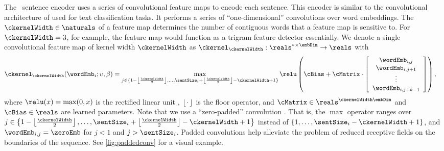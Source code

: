 The \convolutionalneuralnetwork~sentence encoder uses a series of convolutional
feature maps to encode each sentence. This encoder is similar to the
convolutional architecture of \citet{kim2014convolutional} used for text
classification tasks. It performs a series of ``one-dimensional'' convolutions
over word embeddings. The ~$\ckernelWidth \in \naturals$ of a
feature map determines the number of contiguous words that a feature map is
sensitive to. For $\ckernelWidth=3$, for example, the feature map would
function as a trigram feature detector essentially.  We denote a single
convolutional feature map of kernel width $\ckernelWidth$ as
$\ckernel_\ckernelWidth : \reals^{*\times \embDim} \rightarrow \reals$ with
\begin{align}
    \ckernel_\ckernelWidth(\wordEmb_i;\upsilon,\beta)  & 
= \max_{j \in \{ 
    1 - \left\lfloor \frac{\ckernelWidth}{2} \right\rfloor, 
    \ldots, \sentSize_i +  
    \left\lfloor \frac{\ckernelWidth}{2} \right\rfloor - \ckernelWidth + 1 \}}
  \relu\left( \cBias + \cMatrix \cdot \left[ \begin{array}{c} \wordEmb_{i,j}\\ \wordEmb_{i,j+1} \\ \vdots \\ \wordEmb_{i,j+k-1} \end{array} \right] \right),
\end{align}
where $\relu(x) = \max(0, x)$ is the rectified linear unit \citep{nair2010},
$\left\lfloor\cdot\right\rfloor$ is the floor operator, and $\cMatrix \in
\reals^{\ckernelWidth \embDim}$ and $\cBias \in \reals$ are learned parameters.
Note that we use a ``zero-padded'' convolution \citep{dumoulin2016}. That is,
the $\max$ operator ranges over  $j \in \left\{1 - \left\lfloor
\frac{\ckernelWidth}{2} \right\rfloor, \ldots, \sentSize_i +  \left\lfloor
\frac{\ckernelWidth}{2} \right\rfloor - \ckernelWidth + 1 \right\}$ instead of
$\left\{1,\ldots,\sentSize_i - \ckernelWidth + 1\right\}$, and $\wordEmb_{i,j}
= \zeroEmb$ for $j < 1$ and $j > \sentSize_i$. Padded convolutions help
alleviate the problem of reduced receptive fields on the boundaries of the
sequence. See \autoref{fig:paddedconv} for a visual example.



